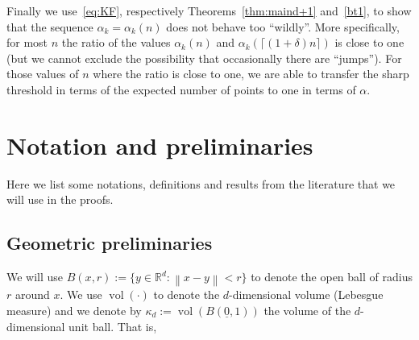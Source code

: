 \documentclass[11pt]{article}%
\newcommand{\eR}[0]{\ensuremath{ \mathbb R}}
\newcommand{\norm}[1]{\ensuremath{\left\|#1\right\|}}
\DeclareMathOperator{\vol}{vol}
\newcommand{\purple}[1]{{\color{lightpurple}#1}}
\newcommand{\MI}[1]{%
  \purple{\bfseries[Matthias: #1]}%
}
\begin{document}
Finally we use~\eqref{eq:KF}, respectively Theorems~\ref{thm:maind+1} and~\ref{bt1}, to show that 
the sequence $\alpha_k=\alpha_k(n)$ does not behave too ``wildly''.
More specifically, for most $n$ the ratio of the values $\alpha_k(n)$ and $\alpha_k( \lceil(1+\delta)n\rceil)$
is close to one (but we cannot exclude the possibility that occasionally there are ``jumps'').
For those values of $n$ where the ratio is close to one, we are able to transfer the sharp threshold in terms 
of the expected number of points to one in terms of $\alpha$.





\section{Notation and preliminaries\label{sec:prelim}}



Here we list some notations, definitions and results from the literature that we will use in the proofs. 


\subsection{Geometric preliminaries\label{sec:geoprel}}


We will use $B(x,r) := \{ y \in \eR^d : \norm{x-y} < r \}$ to denote the open ball of radius $r$ around $x$.
We use $\vol(\cdot)$ to denote the $d$-dimensional volume (Lebesgue measure) and 
we denote by $\kappa_d := \vol( B(\underline{0}, 1 ) )$ the volume of the $d$-dimensional unit ball.
That is,
\end{document}
